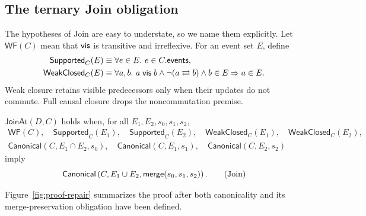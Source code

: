 \subsection{The ternary Join obligation}

The hypotheses of Join are easy to understate, so we name them explicitly.
Let $\mathsf{WF}(C)$ mean that $\vis$ is transitive and irreflexive. For an
event set $E$, define
\begin{align*}
 \mathsf{Supported}_C(E)
   &\equiv \forall e\in E.\ e\in C.\mathsf{events},\\
 \mathsf{WeakClosed}_C(E)
   &\equiv \forall a,b.\ a\vis b\land\neg(a\rightleftarrows b)
          \land b\in E\Rightarrow a\in E.
\end{align*}
Weak closure retains visible predecessors only when their updates do not
commute. Full causal closure drops the noncommutation premise.

\begin{definition}
$\mathsf{JoinAt}(D,C)$ holds when, for all $E_1,E_2,s_0,s_1,s_2$,
\[
\begin{array}{l}
 \mathsf{WF}(C),\quad
 \mathsf{Supported}_C(E_1),\quad\mathsf{Supported}_C(E_2),\quad
 \mathsf{WeakClosed}_C(E_1),\quad\mathsf{WeakClosed}_C(E_2),\\[1mm]
 \mathsf{Canonical}(C,E_1\cap E_2,s_0),\quad
 \mathsf{Canonical}(C,E_1,s_1),\quad
 \mathsf{Canonical}(C,E_2,s_2)
\end{array}
\]
imply
\[
 \mathsf{Canonical}\left(C,E_1\cup E_2,
                    \merge(s_0,s_1,s_2)\right).
 \tag*{(Join)}
\]
\hfill{}
\end{definition}

Figure~\ref{fig:proof-repair} summarizes the proof after both canonicality and
its merge-preservation obligation have been defined.

